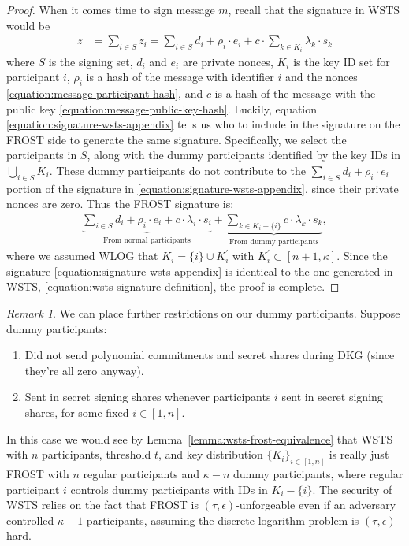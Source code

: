 \documentclass{article}
\theoremstyle{definition}
\theoremstyle{remark}
\newtheorem{rem}[thm]{Remark}
\begin{document}
\begin{proof}
When it comes time to sign message $m$, recall that the signature in WSTS would be
\begin{align}\label{equation:signature-wsts-appendix}
    z & = \sum_{i \in S}^{} z_{i} 
   = \sum_{i \in S}^{} d_{i} + \rho_{i} \cdot e_{i} + c \cdot \sum_{k \in K_i}^{} \lambda_{k} \cdot s_{k}
\end{align}
where $S$ is the signing set, $d_i$ and $e_i$ are private nonces, $K_i$ is the key ID set for participant $i$, $\rho_i$ is a hash of the message with identifier $i$ and the nonces \eqref{equation:message-participant-hash}, and $c$ is a hash of the message with the public key \eqref{equation:message-public-key-hash}. Luckily, equation \eqref{equation:signature-wsts-appendix} tells us who to include in the signature on the FROST side to generate the same signature. Specifically, we select the participants in $S$, along with the dummy participants identified by the key IDs in $\bigcup_{i \in S} K_i$. These dummy participants do not contribute to the $\sum_{i \in S}^{} d_{i} + \rho_{i} \cdot e_{i}$ portion of the signature in \eqref{equation:signature-wsts-appendix}, since their private nonces are zero. Thus the FROST signature is:
\begin{align}\label{equation:signature-frost-appendix}
   \underbrace{\sum_{i \in S}^{} d_{i} + \rho_{i} \cdot e_{i} + c \cdot \lambda_{i} \cdot s_{i}}_{\text{From normal participants}} + \underbrace{\sum_{k \in K_i - \{i\}}^{} c \cdot \lambda_{k} \cdot s_{k}}_{\text{From dummy participants}},
\end{align}
where we assumed WLOG that $K_i = \{ i \} \cup K_i^{\prime}$ with $K_i^\prime \subset [n + 1, \kappa]$. Since the signature \eqref{equation:signature-wsts-appendix} is identical to the one generated in WSTS, \eqref{equation:wsts-signature-definition}, the proof is complete.
\end{proof}

\begin{rem}
    We can place further restrictions on our dummy participants. Suppose dummy participants:
    \begin{enumerate}
        \item Did not send polynomial commitments and secret shares during DKG (since they're all zero anyway).
        \item Sent in secret signing shares whenever participants $i$ sent in secret signing shares, for some fixed $i \in [1, n]$.
    \end{enumerate}
    In this case we would see by Lemma~\ref{lemma:wsts-frost-equivalence} that WSTS with $n$ participants, threshold $t$, and key distribution $\{K_i\}_{i\in [1,n]}$ is really just FROST with $n$ regular participants and $\kappa - n$ dummy participants, where regular participant $i$ controls dummy participants with IDs in $K_i - \{ i\}$. The security of WSTS relies on the fact that FROST is $(\tau, \epsilon)$-unforgeable even if an adversary controlled $\kappa - 1$ participants, assuming the discrete logarithm problem is $(\tau, \epsilon)$-hard. 
\end{rem}
\end{document}
